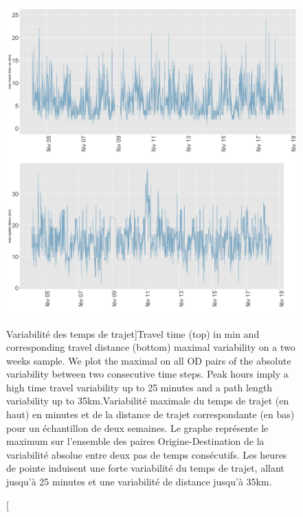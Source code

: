 \begin{figure}
\includegraphics[width=\linewidth]{Figures/Final/8-1-2-fig-transportationequilibrium-fig-3.jpg}
\caption[Variability of travel time and distance][Variabilité des temps de trajet]{Travel time (top) in min and corresponding travel distance (bottom) maximal variability on a two weeks sample. We plot the maximal on all OD pairs of the absolute variability between two consecutive time steps. Peak hours imply a high time travel variability up to 25 minutes and a path length variability up to 35km.\label{fig:transportationequilibrium:fig-3}}{Variabilité maximale du temps de trajet (en haut) en minutes et de la distance de trajet correspondante (en bas) pour un échantillon de deux semaines. Le graphe représente le maximum sur l'ensemble des paires Origine-Destination de la variabilité absolue entre deux pas de temps consécutifs. Les heures de pointe induisent une forte variabilité du temps de trajet, allant jusqu'à 25 minutes et une variabilité de distance jusqu'à 35km.\label{fig:transportationequilibrium:fig-3}}
\end{figure}





